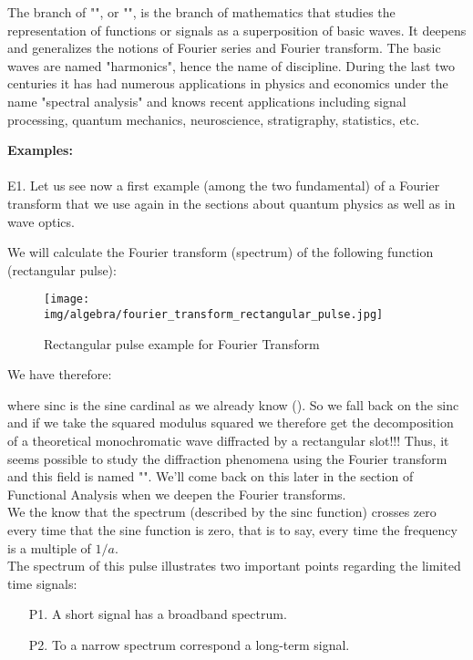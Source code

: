 	\begin{tcolorbox}[title=Remark,colframe=black,arc=10pt]
	The branch of "", or "", is the branch of mathematics that studies the representation of functions or signals as a superposition of basic waves. It deepens and generalizes the notions of Fourier series and Fourier transform. The basic waves are named "harmonics", hence the name of discipline. During the last two centuries it has had numerous applications in physics and economics under the name "spectral analysis" and knows recent applications including signal processing, quantum mechanics, neuroscience, stratigraphy, statistics, etc.
	\end{tcolorbox}
	\begin{tcolorbox}[colframe=black,colback=white,sharp corners]
	\textbf{{\Large {}}Examples:}\\\\
	E1. Let us see now a first example (among the two fundamental) of a Fourier transform that we use again in the sections about quantum physics as well as in wave optics.
	
	We will calculate the Fourier transform (spectrum) of the following function (rectangular pulse):
	\begin{figure}[H]
		\centering
		\texttt{[image: img/algebra/fourier\_transform\_rectangular\_pulse.jpg]}
		\caption[]{Rectangular pulse example for Fourier Transform}
	\end{figure}
	We have therefore:
	
	where $\text{sinc}$ is the sine cardinal as we already know (). So we fall back on the $\text{sinc}$ and if we take the squared modulus squared we therefore get the decomposition of a theoretical monochromatic wave diffracted by a rectangular slot!!! Thus, it seems possible to study the diffraction phenomena using the Fourier transform and this field is named "". We'll come back on this later in the section of Functional Analysis when we deepen the Fourier transforms.\\
	
	We the know that the spectrum (described by the $\text{sinc}$ function) crosses zero every time that the sine function is zero, that is to say, every time the frequency is a multiple of $1 / a$.\\
	
	The spectrum of this pulse illustrates two important points regarding the limited time signals:
	\begin{enumerate}
		\item[P1.] A short signal has a broadband spectrum.
		\item[P2.] To a narrow spectrum correspond a long-term signal.
	\end{enumerate}
	\end{tcolorbox}

